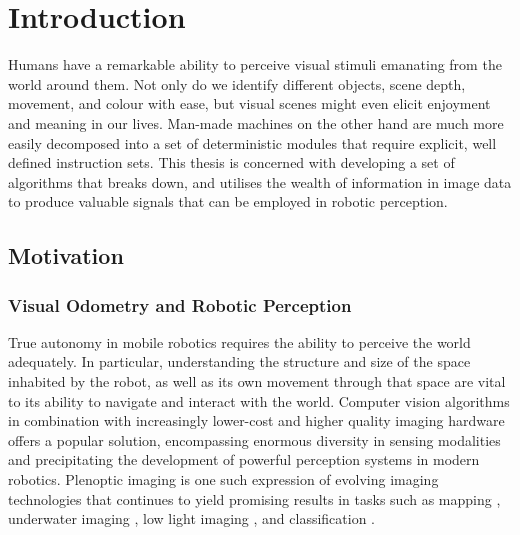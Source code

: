 
\chapter{Introduction}


    


Humans have a remarkable ability to perceive visual stimuli emanating from the world around them. Not only do we identify different objects, scene depth, movement, and colour with ease, but visual scenes might even elicit enjoyment and meaning in our lives. Man-made machines on the other hand are much more easily decomposed into a set of deterministic modules that require explicit, well defined instruction sets. This thesis is concerned with developing a set of algorithms that breaks down, and utilises the wealth of information in image data to produce valuable signals that can be employed in robotic perception. 


\section{Motivation}
\subsection{Visual Odometry and Robotic Perception}
True  autonomy in mobile robotics requires the ability to perceive the world adequately. In particular, understanding the structure and size of the space inhabited by the robot, as well as its own movement through that space are vital to its ability to navigate and interact with the world. Computer vision algorithms in combination with increasingly lower-cost and higher quality imaging hardware offers a popular solution, encompassing enormous diversity in sensing modalities and precipitating the development of powerful perception systems in modern robotics. Plenoptic imaging is one such expression of evolving imaging technologies that continues to yield promising results in tasks such as mapping \cite{kuehefuss2016rgbdslam}, underwater imaging \cite{skinner2016underwaterplenoptic}, low light imaging \cite{dansereau2015volumetric}, and classification \cite{wang2016lfcnn}.


